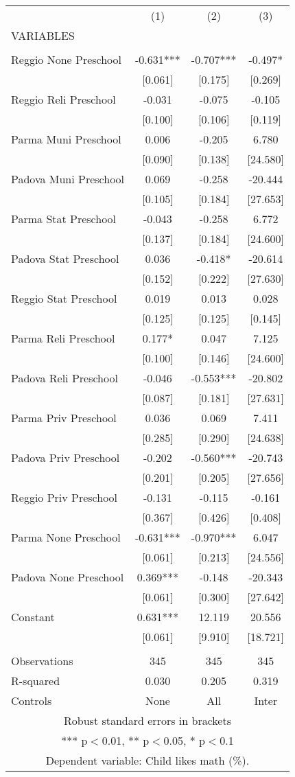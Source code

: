 \begin{tabular}{lccc} \hline
 & (1) & (2) & (3) \\
VARIABLES &  &  &  \\ \hline
 &  &  &  \\
Reggio None Preschool & -0.631*** & -0.707*** & -0.497* \\
 & [0.061] & [0.175] & [0.269] \\
Reggio Reli Preschool & -0.031 & -0.075 & -0.105 \\
 & [0.100] & [0.106] & [0.119] \\
Parma Muni Preschool & 0.006 & -0.205 & 6.780 \\
 & [0.090] & [0.138] & [24.580] \\
Padova Muni Preschool & 0.069 & -0.258 & -20.444 \\
 & [0.105] & [0.184] & [27.653] \\
Parma Stat Preschool & -0.043 & -0.258 & 6.772 \\
 & [0.137] & [0.184] & [24.600] \\
Padova Stat Preschool & 0.036 & -0.418* & -20.614 \\
 & [0.152] & [0.222] & [27.630] \\
Reggio Stat Preschool & 0.019 & 0.013 & 0.028 \\
 & [0.125] & [0.125] & [0.145] \\
Parma Reli Preschool & 0.177* & 0.047 & 7.125 \\
 & [0.100] & [0.146] & [24.600] \\
Padova Reli Preschool & -0.046 & -0.553*** & -20.802 \\
 & [0.087] & [0.181] & [27.631] \\
Parma Priv Preschool & 0.036 & 0.069 & 7.411 \\
 & [0.285] & [0.290] & [24.638] \\
Padova Priv Preschool & -0.202 & -0.560*** & -20.743 \\
 & [0.201] & [0.205] & [27.656] \\
Reggio Priv Preschool & -0.131 & -0.115 & -0.161 \\
 & [0.367] & [0.426] & [0.408] \\
Parma None Preschool & -0.631*** & -0.970*** & 6.047 \\
 & [0.061] & [0.213] & [24.556] \\
Padova None Preschool & 0.369*** & -0.148 & -20.343 \\
 & [0.061] & [0.300] & [27.642] \\
Constant & 0.631*** & 12.119 & 20.556 \\
 & [0.061] & [9.910] & [18.721] \\
 &  &  &  \\
Observations & 345 & 345 & 345 \\
R-squared & 0.030 & 0.205 & 0.319 \\
 Controls & None & All & Inter \\ \hline
\multicolumn{4}{c}{ Robust standard errors in brackets} \\
\multicolumn{4}{c}{ *** p$<$0.01, ** p$<$0.05, * p$<$0.1} \\
\multicolumn{4}{c}{ Dependent variable: Child likes math (\%).} \\
\end{tabular}
